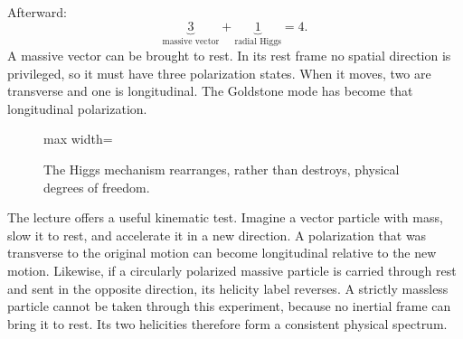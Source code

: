 Afterward:
\begin{equation}
  \underbrace{3}_{\text{massive vector}}
  +
  \underbrace{1}_{\text{radial Higgs}}
  =4.
  \label{eq:l08-degree-count}
\end{equation}
A massive vector can be brought to rest. In its rest frame no spatial
direction is privileged, so it must have three polarization states. When it
moves, two are transverse and one is longitudinal. The Goldstone mode has
become that longitudinal polarization.

\begin{figure}[htbp]
\centering
\begin{adjustbox}{max width=\linewidth}
\end{adjustbox}
\caption{The Higgs mechanism rearranges, rather than destroys, physical
degrees of freedom.}
\label{fig:l08-degree-rearrangement}
\end{figure}

\begin{classroomqa}
\end{classroomqa}

The lecture offers a useful kinematic test. Imagine a vector particle with
mass, slow it to rest, and accelerate it in a new direction. A polarization
that was transverse to the original motion can become longitudinal relative
to the new motion. Likewise, if a circularly polarized massive particle is
carried through rest and sent in the opposite direction, its helicity label
reverses. A strictly massless particle cannot be taken through this
experiment, because no inertial frame can bring it to rest. Its two
helicities therefore form a consistent physical spectrum.

